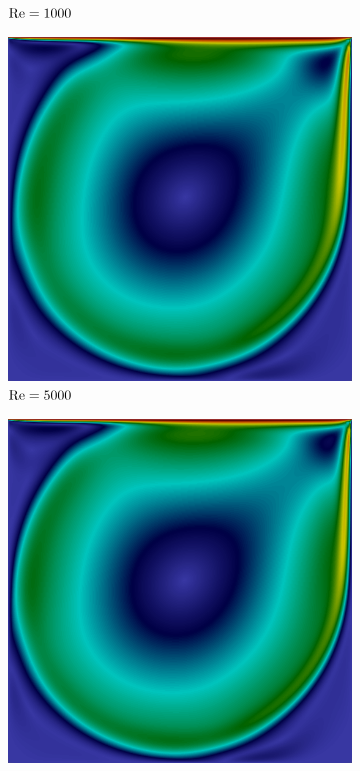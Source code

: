 \begin{figure}[h!]
\begin{subfigure}{0.32\textwidth}
        \caption{$\mathrm{Re}=1000$}
    \end{subfigure}
    \begin{subfigure}{0.32\textwidth}
        \includegraphics[width=\linewidth]{Figuras/Cavity/Re5000.png}
        \caption{$\mathrm{Re}=5000$}
    \end{subfigure}
    \begin{subfigure}{0.32\textwidth}
        \includegraphics[width=\linewidth]{Figuras/Cavity/Re7500.png}

\end{subfigure}
\end{figure}
